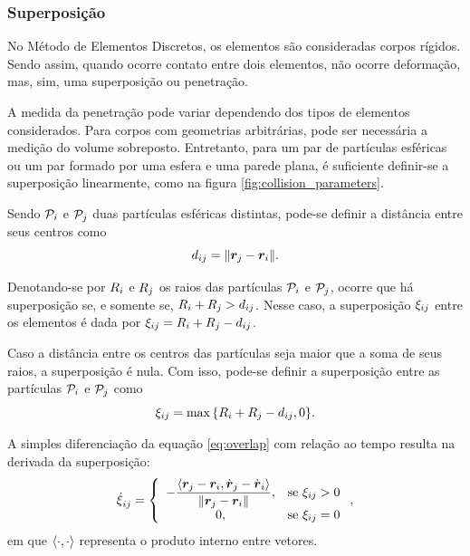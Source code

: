 \subsubsection*{Superposição} 

No Método de Elementos Discretos, os elementos são consideradas corpos rígidos. Sendo assim, quando ocorre contato entre dois elementos, não ocorre deformação, mas, sim, uma superposição ou penetração.

A medida da penetração pode variar dependendo dos tipos de elementos considerados. Para corpos com geometrias arbitrárias, pode ser necessária a medição do volume sobreposto. Entretanto, para um par de partículas esféricas ou um par formado por uma esfera e uma parede plana, é suficiente definir-se a superposição linearmente, como na figura \ref{fig:collision_parameters}.

Sendo \(\particlei\) e \(\particlej\) duas partículas esféricas distintas, pode-se definir a distância entre seus centros como 
\begin{equation*}
	{d}_{i j} = \norm{{\bm{r}}_{j} - {\bm{r}}_{i}}.
\end{equation*}

Denotando-se por \({R}_{i}\) e \({R}_{j}\) os raios das partículas \(\particlei\) e \(\particlej\), ocorre que há superposição se, e somente se, \({R}_{i} + {R}_{j} > {d}_{i j}\). Nesse caso, a superposição \({\xi}_{i j}\) entre os elementos é dada por \({\xi}_{i j} = {R}_{i} + {R}_{j} - {d}_{i j}\).

Caso a distância entre os centros das partículas seja maior que a soma de seus raios, a superposição é nula. Com isso, pode-se definir a superposição entre as partículas \(\particlei\) e \(\particlej\) como
\begin{equation} \label{eq:overlap}
	\overlapij = \max\Bqty{\radiusi + \radiusj - \distanceij, 0}.
\end{equation}

A simples diferenciação da equação \eqref{eq:overlap} com relação ao tempo resulta na derivada da superposição:
\begin{equation} \label{eq:spherical_particle_overlap_derivative}
	\overlapDerivativeij =
	\left\lbrace
	\begin{array}{cl}
		- \dfrac{\innerProduct{\positionj - \positioni}{\velocityj - \velocityi}}{\norm{\positionj - \positioni}},
		& \text{se } \overlapij > 0 \\
		0, & \text{se } \overlapij = 0
	\end{array}
	\right.
	,
\end{equation}
em que \(\left\langle \cdot, \cdot \right\rangle\) representa o produto interno entre vetores.

